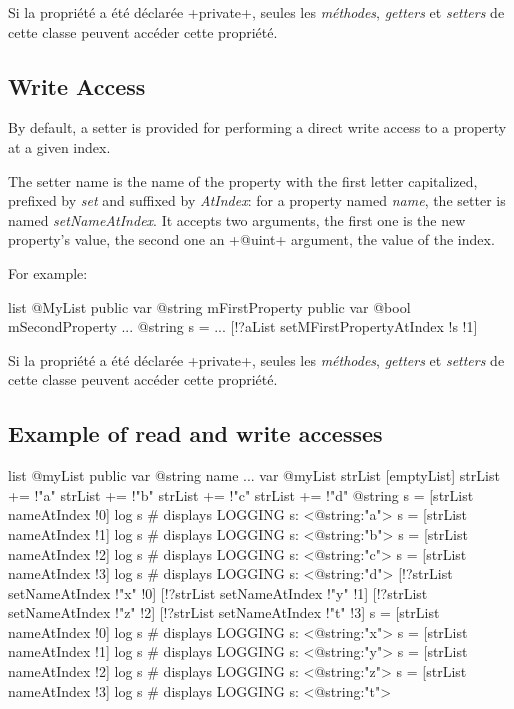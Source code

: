 Si la propriété a été déclarée \ggs+private+, seules les \emph{méthodes}, \emph{getters} et \emph{setters} de cette classe peuvent accéder cette propriété.



\subsection{Write Access}

By default, a setter is provided for performing a direct write access to a property at a given index.

The setter name is the name of the property with the first letter capitalized, prefixed by \emph{set} and suffixed by \emph{AtIndex}: for a property named \emph{name}, the setter is named \emph{setNameAtIndex}. It accepts two arguments, the first one is the new property's value, the second one an \ggs+@uint+ argument, the value of the index.

For example:

\begin{galgas}
list @MyList {
  public var @string mFirstProperty
  public var @bool mSecondProperty
}
...
@string s = ...
[!?aList setMFirstPropertyAtIndex !s !1]
\end{galgas}

Si la propriété a été déclarée \ggs+private+, seules les \emph{méthodes}, \emph{getters} et \emph{setters} de cette classe peuvent accéder cette propriété.


\subsection{Example of read and write accesses}

\begin{galgas}
list @myList {
  public var @string name
}
...
var @myList strList [emptyList]
strList += !"a"
strList += !"b"
strList += !"c"
strList += !"d"
@string s = [strList nameAtIndex !0]
log s # displays LOGGING s: <@string:"a">
s = [strList nameAtIndex !1]
log s # displays LOGGING s: <@string:"b">
s = [strList nameAtIndex !2]
log s # displays LOGGING s: <@string:"c">
s = [strList nameAtIndex !3]
log s # displays LOGGING s: <@string:"d">
[!?strList setNameAtIndex !"x" !0]
[!?strList setNameAtIndex !"y" !1]
[!?strList setNameAtIndex !"z" !2]
[!?strList setNameAtIndex !"t" !3]
s = [strList nameAtIndex !0]
log s # displays LOGGING s: <@string:"x">
s = [strList nameAtIndex !1]
log s # displays LOGGING s: <@string:"y">
s = [strList nameAtIndex !2]
log s # displays LOGGING s: <@string:"z">
s = [strList nameAtIndex !3]
log s # displays LOGGING s: <@string:"t">
\end{galgas}


